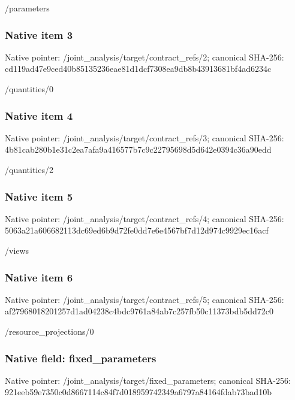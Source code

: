 \documentclass[10pt,a4paper]{article}
\begin{document}
\begingroup\raggedright\sloppy /\allowbreak{}parameters\par\endgroup

\subsubsection{Native item 3}
Native pointer: /joint\_\allowbreak{}analysis/target/contract\_\allowbreak{}refs/2; canonical SHA-256: cd119ad47e9ced40b85135236eae81d1dcf7308ea9db8b43913681bf4ad6234c

\begingroup\raggedright\sloppy /\allowbreak{}quantities/\allowbreak{}0\par\endgroup

\subsubsection{Native item 4}
Native pointer: /joint\_\allowbreak{}analysis/target/contract\_\allowbreak{}refs/3; canonical SHA-256: 4b81cab280b1e31c2ea7afa9a416577b7c9c22795698d5d642e0394c36a90edd

\begingroup\raggedright\sloppy /\allowbreak{}quantities/\allowbreak{}2\par\endgroup

\subsubsection{Native item 5}
Native pointer: /joint\_\allowbreak{}analysis/target/contract\_\allowbreak{}refs/4; canonical SHA-256: 5063a21a606682113dc69ed6b9d72fe0dd7e6e4567bf7d12d974c9929ec16acf

\begingroup\raggedright\sloppy /\allowbreak{}views\par\endgroup

\subsubsection{Native item 6}
Native pointer: /joint\_\allowbreak{}analysis/target/contract\_\allowbreak{}refs/5; canonical SHA-256: af27968018201257d1ad04238c4bdc9761a84ab7c257fb50c11373bdb5dd72c0

\begingroup\raggedright\sloppy /\allowbreak{}resource\_\allowbreak{}projections/\allowbreak{}0\par\endgroup

\subsubsection{Native field: fixed\_\allowbreak{}parameters}
Native pointer: /joint\_\allowbreak{}analysis/target/fixed\_\allowbreak{}parameters; canonical SHA-256: 921eeb59e7350c0d8667114c84f7d018959742349a6797a84164fdab73bad10b
\end{document}
